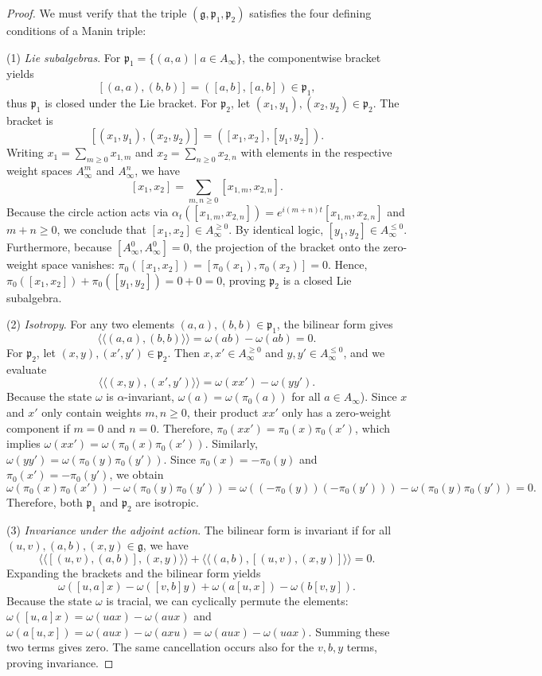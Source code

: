 \documentclass[11pt,reqno]{amsart}
\theoremstyle{definition}
\numberwithin{equation}{section}
\begin{document}
\begin{proof}
We must verify that the triple $(\mathfrak{g}, \mathfrak{p}_1, \mathfrak{p}_2)$ satisfies the four defining conditions of a Manin triple:

(1) \textit{Lie subalgebras}. For $\mathfrak{p}_1 = \{(a, a) \mid a \in A_{\infty}\}$, the componentwise bracket yields
\[
[(a, a), (b, b)] = ([a, b], [a, b]) \in \mathfrak{p}_1,
\]
thus $\mathfrak{p}_1$ is closed under the Lie bracket. For $\mathfrak{p}_2$, let $(x_1, y_1), (x_2, y_2) \in \mathfrak{p}_2$. The bracket is
\[
[(x_1, y_1), (x_2, y_2)] = ([x_1, x_2], [y_1, y_2]).
\]
Writing $x_1 = \sum_{m \ge 0} x_{1,m}$ and $x_2 = \sum_{n \ge 0} x_{2,n}$ with elements in the respective weight spaces $A_{\infty}^m$ and $A_{\infty}^n$, we have
\[
[x_1, x_2] = \sum_{m, n \ge 0} [x_{1,m}, x_{2,n}].
\]
Because the circle action acts via $\alpha_t([x_{1,m}, x_{2,n}]) = e^{i(m+n)t}[x_{1,m}, x_{2,n}]$ and $m+n \ge 0$, we conclude that $[x_1, x_2] \in A_{\infty}^{\ge 0}$. By identical logic, $[y_1, y_2] \in A_{\infty}^{\le 0}$. Furthermore, because $[A_{\infty}^0, A_{\infty}^0] = 0$, the projection of the bracket onto the zero-weight space vanishes: $\pi_0([x_1, x_2]) = [\pi_0(x_1), \pi_0(x_2)] = 0$. Hence, $\pi_0([x_1, x_2]) + \pi_0([y_1, y_2]) = 0 + 0 = 0$, proving $\mathfrak{p}_2$ is a closed Lie subalgebra.

(2) \textit{Isotropy}. For any two elements $(a, a), (b, b) \in \mathfrak{p}_1$, the bilinear form gives
\[
\langle\langle (a, a), (b, b) \rangle\rangle = \omega(ab) - \omega(ab) = 0.
\]
For $\mathfrak{p}_2$, let $(x, y), (x', y') \in \mathfrak{p}_2$. Then $x, x' \in A_{\infty}^{\ge 0}$ and $y, y' \in A_{\infty}^{\le 0}$, and we evaluate
\[
\langle\langle (x, y), (x', y') \rangle\rangle = \omega(xx') - \omega(yy').
\]
Because the state $\omega$ is $\alpha$-invariant, $\omega(a) = \omega(\pi_0(a))$ for all $a \in A_\infty$). Since $x$ and $x'$ only contain weights $m, n \ge 0$, their product $xx'$ only has a zero-weight component if $m=0$ and $n=0$. Therefore, $\pi_0(xx') = \pi_0(x)\pi_0(x')$, which implies $\omega(xx') = \omega(\pi_0(x)\pi_0(x'))$. Similarly, $\omega(yy') = \omega(\pi_0(y)\pi_0(y'))$. Since $\pi_0(x) = -\pi_0(y)$ and $\pi_0(x') = -\pi_0(y')$, we obtain
\[
\omega(\pi_0(x)\pi_0(x')) - \omega(\pi_0(y)\pi_0(y')) = \omega((-\pi_0(y))(-\pi_0(y'))) - \omega(\pi_0(y)\pi_0(y')) = 0.
\]
Therefore, both $\mathfrak{p}_1$ and $\mathfrak{p}_2$ are isotropic.

(3) \textit{Invariance under the adjoint action}. The bilinear form is invariant if for all $(u, v), (a, b), (x, y) \in \mathfrak{g}$, we have
\[
\langle\langle [(u, v), (a, b)], (x, y) \rangle\rangle + \langle\langle (a, b), [(u, v), (x, y)] \rangle\rangle = 0.
\]
Expanding the brackets and the bilinear form yields
\[
\omega([u, a]x) - \omega([v, b]y) + \omega(a[u, x]) - \omega(b[v, y]).
\]
Because the state $\omega$ is tracial, we can cyclically permute the elements: $\omega([u,a]x) = \omega(uax) - \omega(aux)$ and $\omega(a[u,x]) = \omega(aux) - \omega(axu) = \omega(aux) - \omega(uax)$. Summing these two terms gives zero. The same cancellation occurs also for the $v, b, y$ terms, proving invariance.


\end{proof}
\end{document}
